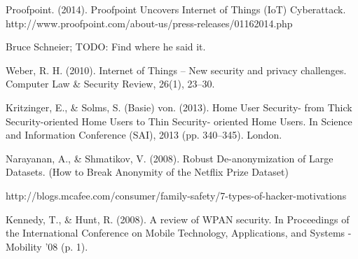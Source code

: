 \documentclass[10pt,journal,compsoc]{IEEEtran}
\begin{document}
\begin{thebibliography}{1}
Proofpoint. (2014). Proofpoint Uncovers Internet of Things (IoT) Cyberattack. http://www.proofpoint.com/about-us/press-releases/01162014.php

Bruce Schneier; TODO: Find where he said it.

Weber, R. H. (2010). Internet of Things – New security and privacy challenges. Computer Law \& Security Review, 26(1), 23–30. 

Kritzinger, E., \& Solms, S. (Basie) von. (2013). Home User Security- from Thick Security-oriented Home Users to Thin Security- oriented Home Users. In Science and Information Conference (SAI), 2013 (pp. 340–345). London.

Narayanan, A., \& Shmatikov, V. (2008). Robust De-anonymization of Large Datasets. (How to Break Anonymity of the Netflix Prize Dataset)

http://blogs.mcafee.com/consumer/family-safety/7-types-of-hacker-motivations

Kennedy, T., \& Hunt, R. (2008). A review of WPAN security. In Proceedings of the International Conference on Mobile Technology, Applications, and Systems - Mobility ’08 (p. 1).
\end{thebibliography}



\end{document}
